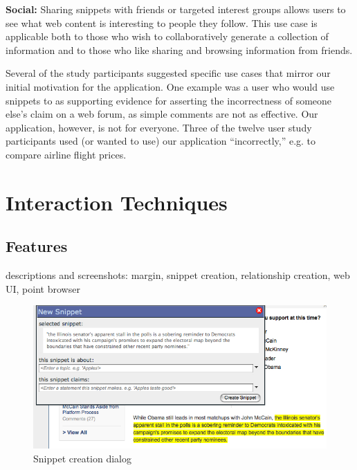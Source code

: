 \documentclass{chi2009}
\begin{document}
\textbf{Social:} Sharing snippets with friends or targeted interest groups allows users to see what web content is interesting to people they follow. This use case is applicable both to those who wish to collaboratively generate a collection of information and to those who like sharing and browsing information from friends.

Several of the study participants suggested specific use cases that mirror our initial motivation for the application. One example was a user who would use snippets to as supporting evidence for asserting the incorrectness of someone else's claim on a web forum, as simple comments are not as effective. Our application, however, is not for everyone. Three of the twelve user study participants used (or wanted to use) our application ``incorrectly,'' e.g. to compare airline flight prices.


\section{Interaction Techniques}

\subsection{Features}
descriptions and screenshots: margin, snippet creation, relationship creation, web UI, point browser
\begin{figure}[ht]
	\includegraphics[scale=0.35]{../screenshots/snippetdialog_sm.jpg}
	\caption{Snippet creation dialog}
	\label{snippetdialog}
\end{figure}
\end{document}
